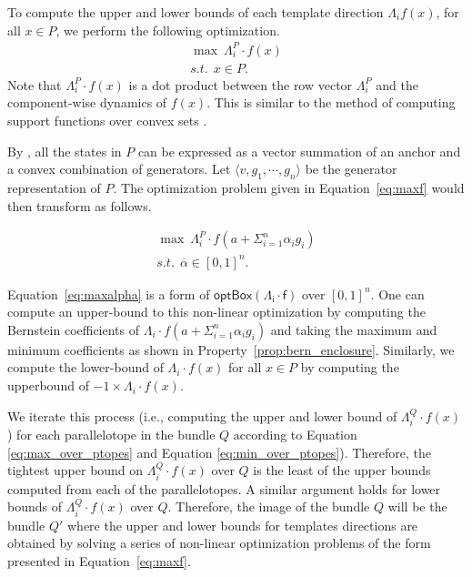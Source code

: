 %
%
%
%
To compute the upper and lower bounds of each template direction $\Lambda_{i} f(x)$, for all $x \in P$, we perform the following optimization.
%
\begin{eqnarray}
  \max ~ \Lambda_i^{P} \cdot f(x) \label{eq:maxf}\\
  s.t. ~~ x \in P.\nonumber
\end{eqnarray}
%
\noindent Note that $\Lambda_i^{P} \cdot f(x)$ is a dot product between the row vector $\Lambda_i^{P}$ and the component-wise dynamics of $f(x)$. This is similar to the method of computing support functions over convex sets \cite{boyd2004convex}.


By , all the states in $P$ can be expressed as a vector summation of an anchor and a convex combination of generators.
%
Let  $\langle v, g_1, \cdots, g_n \rangle$ be the generator representation of $P$.
%
The optimization problem given in Equation~\ref{eq:maxf} would then transform as follows.

\begin{eqnarray}
  \max ~ \Lambda_i^P \cdot f(a + \Sigma_{i=1}^{n} \alpha_i g_i) \label{eq:maxalpha}\\
  s.t. ~~ \overline\alpha \in [0,1]^{n}.\nonumber
\end{eqnarray}

Equation~\ref{eq:maxalpha} is a form of $\mathsf{optBox(\Lambda_{i} \cdot f)}$ over $[0,1]^n$.
%
One can compute an upper-bound to this non-linear optimization by computing the Bernstein coefficients of $\Lambda_i \cdot f(a + \Sigma_{i=1}^{n} \alpha_i g_i)$ and taking the maximum and minimum coefficients as shown in Property~\ref{prop:bern_enclosure}.
%
Similarly, we compute the lower-bound of $\Lambda_{i}\cdot f(x)$ for all $x \in P$ by computing the upperbound of $-1 \times \Lambda_{i}\cdot f(x)$.
%

We iterate this process (i.e., computing the upper and lower bound of $\Lambda^Q_{i}\cdot f(x)$) for each parallelotope in the bundle $Q$ according to Equation \ref{eq:max_over_ptopes} and Equation \ref{eq:min_over_ptopes}).
%
%
Therefore, the tightest upper bound on $\Lambda^Q_{i}\cdot f(x)$ over $Q$ is the least of the upper bounds computed from each of the parallelotopes.
%
A similar argument holds for lower bounds of $\Lambda^Q_{i}\cdot f(x)$ over $Q$.
%
Therefore, the image of the bundle $Q$ will be the bundle $Q'$ where the upper and lower bounds for templates directions are obtained by solving a series of non-linear optimization problems of the form presented in Equation~\ref{eq:maxf}.

